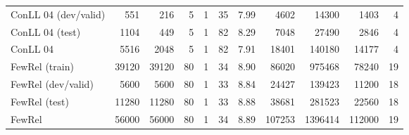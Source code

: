 \begin{tabular}{lrrrrrrrrrr}
 ConLL 04 (dev/valid)  &           551 &             216 &                    5 &                       1 &                      35 &                    7.99 &         4602 &        14300 &           1403 &                 4 \\
 ConLL 04 (test)       &          1104 &             449 &                    5 &                       1 &                      82 &                    8.29 &         7048 &        27490 &           2846 &                 4 \\
 ConLL 04              &          5516 &            2048 &                    5 &                       1 &                      82 &                    7.91 &        18401 &       140180 &          14177 &                 4 \\
 FewRel (train)        &         39120 &           39120 &                   80 &                       1 &                      34 &                    8.90 &        86020 &       975468 &          78240 &                19 \\
 FewRel (dev/valid)    &          5600 &            5600 &                   80 &                       1 &                      33 &                    8.84 &        24427 &       139423 &          11200 &                18 \\
 FewRel (test)         &         11280 &           11280 &                   80 &                       1 &                      33 &                    8.88 &        38681 &       281523 &          22560 &                18 \\
 FewRel                &         56000 &           56000 &                   80 &                       1 &                      34 &                    8.89 &       107253 &      1396414 &         112000 &                19 \\
\hline
\end{tabular}